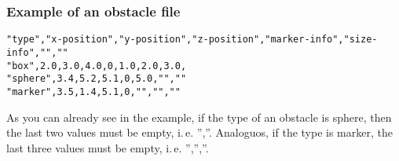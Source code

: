 \subsubsection{Example of an obstacle file}
\begin{lstlisting}
"type","x-position","y-position","z-position","marker-info","size-info","",""
"box",2.0,3.0,4.0,0,1.0,2.0,3.0,
"sphere",3.4,5.2,5.1,0,5.0,"",""
"marker",3.5,1.4,5.1,0,"","",""
\end{lstlisting}
As you can already see in the example, if the type of an obstacle is sphere, then the last two values must be empty, i.\,e. '',''. Analoguos, if the type is marker, the last three values must be empty, i.\,e. '','',''.
